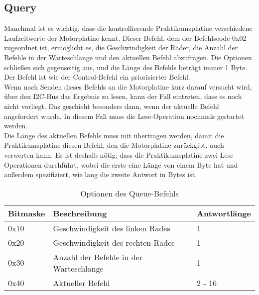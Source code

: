 \subsection{Query}
Manchmal ist es wichtig, dass die kontrollierende Praktikumsplatine verschiedene Laufzeitwerte
der Motorplatine kennt. Dieser Befehl, dem der Befehlscode 0x02 zugeordnet ist, ermöglicht
es, die Geschwindigkeit der Räder, die Anzahl der Befehle in der Warteschlange und den aktuellen
Befehl abzufragen. Die Optionen schließen sich gegenseitig aus, und die Länge des Befehls beträgt
immer 1 Byte. Der Befehl ist wie der Control-Befehl ein priorisierter Befehl.\\
Wenn nach Senden dieses Befehls an die Motorplatine kurz darauf versucht wird, über den I2C-Bus
das Ergebnis zu lesen, kann der Fall eintreten, dass es noch nicht vorliegt.
Das geschieht besonders dann, wenn der aktuelle Befehl angefordert wurde.
In diesem Fall muss die Lese-Operation nochmals gestartet werden.\\
Die Länge des aktuellen Befehls muss mit übertragen werden, damit die Praktikumsplatine
diesen Befehl, den die Motorplatine zurückgibt, auch verwerten kann.
Es ist deshalb nötig, dass die Praktikumsplatine zwei Lese-Operationen durchführt,
wobei die erste eine Länge von einem Byte hat und außerdem spezifiziert, wie lang die zweite Antwort in Bytes ist.

\begin{table}[htb]
\begin{center}
	\begin{tabularx}{\linewidth}{|l|l|X|}
		\hline
		\textbf{Bitmaske} & \textbf{Beschreibung} & \textbf{Antwortlänge} \\
		\hline
		\hline
		0x10 				& Geschwindigkeit des linken Rades & 1 \\
		\hline
		0x20				& Geschwindigkeit des rechten Rades & 1 \\
		\hline
		0x30				& Anzahl der Befehle in der Warteschlange & 1 \\
		\hline
		0x40				& Aktueller Befehl & 2 - 16 \\
		\hline
	\end{tabularx}
	\caption{\label{protocol_queue} Optionen des Queue-Befehls}
\end{center}
\end{table}

